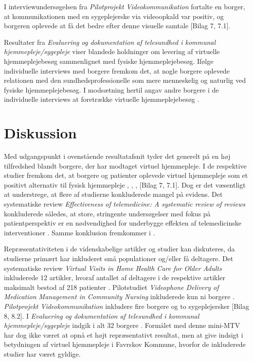 I interviewundersøgelsen fra \textit{Pilotprojekt Videokommunikation} fortalte en borger, at kommunikationen med en sygeplejerske via videoopkald var positiv, og borgeren oplevede at få det bedre efter denne visuelle samtale [Bilag 7, 7.1]. 

Resultater fra \textit{Evaluering og dokumentation af telesundhed i kommunal hjemmepleje/sygepleje} viser blandede holdninger om levering af virtuelle hjemmeplejebesøg sammenlignet med fysiske hjemmeplejebesøg. Ifølge individuelle interviews med borgere fremkom det, at nogle borgere oplevede relationen med den sundhedsprofessionelle som mere menneskelig og naturlig ved fysiske hjemmeplejebesøg. I modsætning hertil angav andre borgere i de individuelle interviews at foretrække virtuelle hjemmeplejebesøg \cite{kandidat}.

\section{Diskussion}
Med udgangspunkt i ovenstående resultatafsnit tyder det generelt på en høj tilfredshed blandt borgere, der har modtaget virtuel hjemmepleje. I de respektive studier fremkom det, at borgere og patienter oplevede virtuel hjemmepleje som et positivt alternativ til fysisk hjemmepleje  \cite{wade}, \cite{Baf2}, \cite{kandidat}, [Bilag 7, 7.1]. Dog er det væsentligt at understrege, at flere af studierne konkluderede mangel på evidens. Det systematiske review \textit{Effectiveness of telemedicine: A systematic review of reviews} konkluderede således, at store, stringente undersøgelser med fokus på patientperspektiv er en nødvendighed for underbygge effekten af telemedicinske interventioner \cite{Ekeland}. Samme konklusion fremkommer i  \cite{Mair}. 

Repræsentativiteten i de videnskabelige artikler og studier kan diskuteres, da studierne primært har inkluderet små populationer og/eller få deltagere. Det systematiske review \textit{Virtual Visits in Home Health Care for Older Adults} inkluderede 12 artikler, hvoraf antallet af deltagere i de respektive artikler maksimalt bestod af 218 patienter \cite{Baf2}. Pilotstudiet \textit{Videophone Delivery of Medication Management in Community Nursing} inkluderede kun ni borgere \cite{wade}. \textit{Pilotprojekt Videokommunikation} inkludere fire borgere og to sygeplejersker [Bilag 8, 8.2]. I \textit{Evaluering og dokumentation af telesundhed i kommunal hjemmepleje/sygepleje} indgik i alt 32 borgere \cite{kandidat}. Formålet med denne mini-MTV har dog ikke været at opnå et højt repræsentativt resultat, men at give indsigt i betydningen af virtuel hjemmepleje i Favrskov Kommune, hvorfor de inkluderede studier har været gyldige. 

